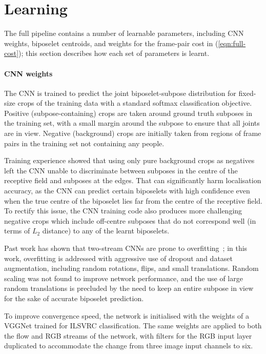 \documentclass[runningheads]{llncs}
\begin{document}
\section{Learning}\label{sec:learning}

The full pipeline contains a number of learnable parameters, including CNN
weights, biposelet centroids, and weights for the frame-pair cost in
(\ref{eqn:full-cost}); this section describes how each set of parameters is
learnt.

\paragraph{CNN weights} The CNN is trained to predict the joint
biposelet-subpose distribution for fixed-size crops of the training data with a
standard softmax classification objective. Positive (subpose-containing) crops
are taken around ground truth subposes in the training set, with a small margin
around the subpose to ensure that all joints are in view. Negative (background)
crops are initially taken from regions of frame pairs in the training set not
containing any people.

Training experience showed that using only pure background crops as negatives
left the CNN unable to discriminate between subposes in the centre of the
receptive field and subposes at the edges. That can significantly harm
localisation accuracy, as the CNN can predict certain biposelets with high
confidence even when the true centre of the biposelet lies far from the centre
of the receptive field. To rectify this issue, the CNN training code also
produces more challenging negative crops which include off-centre subposes that
do not correspond well (in terms of $L_2$ distance) to any of the learnt
biposelets.

Past work has shown that two-stream CNNs are prone to
overfitting~\cite{wang2015towards}; in this work, overfitting is addressed with
aggressive use of dropout and dataset augmentation, including random rotations,
flips, and small translations. Random scaling was not found to improve network
performance, and the use of large random translations is precluded by the need
to keep an entire subpose in view for the sake of accurate biposelet
prediction.

To improve convergence speed, the network is initialised with the weights of a
VGGNet trained for ILSVRC classification. The same weights are applied to both
the flow and RGB streams of the network, with filters for the RGB input layer
duplicated to accommodate the change from three image input channels to six.
\end{document}
